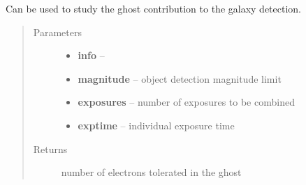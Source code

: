 \documentclass[a4paper,11pt,english]{sphinxmanual}
\begin{document}

\begin{fulllineitems}
\label{ETC:ETC.ETC.galaxyDetection}
Can be used to study the ghost contribution to the galaxy detection.
\begin{quote}\begin{description}
\item[{Parameters}] \leavevmode\begin{itemize}
\item {} 
\textbf{info} -- 

\item {} 
\textbf{magnitude} -- object detection magnitude limit

\item {} 
\textbf{exposures} -- number of exposures to be combined

\item {} 
\textbf{exptime} -- individual exposure time

\end{itemize}

\item[{Returns}] \leavevmode
number of electrons tolerated in the ghost

\end{description}\end{quote}

\end{fulllineitems}

\end{document}

